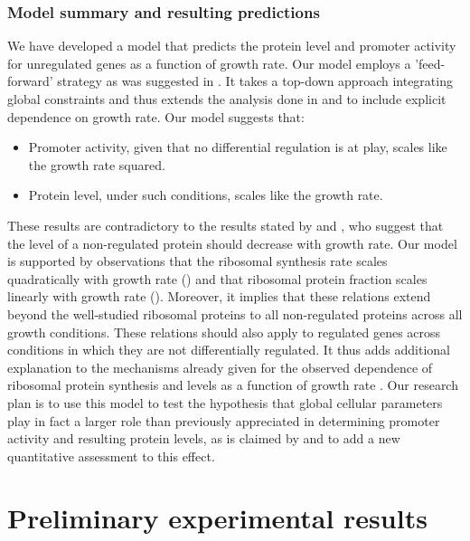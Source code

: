 \documentclass[a4page,notitlepage]{article}
\begin{document}
\subsubsection{Model summary and resulting predictions}
We have developed a model that predicts the protein level and promoter activity for unregulated genes as a function of growth rate.
Our model employs a 'feed-forward' strategy as was suggested in \parencite{Levy2009}.
It takes a top-down approach integrating global constraints and thus extends the analysis done in \parencite{Leeat2013} and \parencite{Maaloe1969} to include explicit dependence on growth rate.
Our model suggests that:
\begin{itemize}
\item Promoter activity, given that no differential regulation is at play, scales like the growth rate squared.
\item Protein level, under such conditions, scales like the growth rate.
\end{itemize}
These results are contradictory to the results stated by \parencite{Klumpp2009a} and \parencite{Scott2010b}, who suggest that the level of a non-regulated protein should decrease with growth rate.
Our model is supported by observations that the ribosomal synthesis rate scales quadratically with growth rate (\parencite{Zaslaver2009a}) and that ribosomal protein fraction scales linearly with growth rate (\parencite{Maaloe1969,ingraham1983growth}).
Moreover, it implies that these relations extend beyond the well-studied ribosomal proteins to all non-regulated proteins across all growth conditions.
These relations should also apply to regulated genes across conditions in which they are not differentially regulated.
It thus adds additional explanation to the mechanisms already given for the observed dependence of ribosomal protein synthesis and levels as a function of growth rate \parencite{Zaslaver2009a}.
Our research plan is to use this model to test the hypothesis that global cellular parameters play in fact a larger role than previously appreciated in determining promoter activity and resulting protein levels, as is claimed by \parencite{Berthoumieux2013,Leeat2013,loven2012,Scott2010b,Klumpp2009a} and to add a new quantitative assessment to this effect.
\section{Preliminary experimental results}
\end{document}
